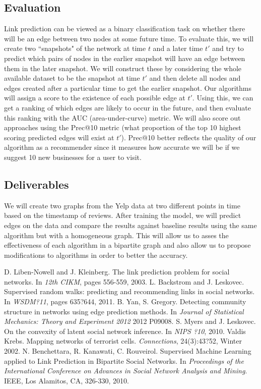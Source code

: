 \documentclass[11pt]{article}
\begin{document}
\subsection{Evaluation}
Link prediction can be viewed as a binary classification task on whether there will be an edge between two nodes at some future time. To evaluate this, we will create two ``snapshots" of the network at time $t$ and a later time $t'$ and try to predict which pairs of nodes in the earlier snapshot will have an edge between them in the later snapshot. We will construct these by considering the whole available dataset to be the snapshot at time $t'$ and then delete all nodes and edges created after a particular time to get the earlier snapshot. Our algorithms will assign a score to the existence of each possible edge at $t'$. Using this, we can get a ranking of which edges are likely to occur in the future, and then evaluate this ranking with the AUC (area-under-curve) metric. We will also score out approaches using the Prec@10 metric (what proportion of the top 10 highest scoring predicted edges will exist at $t'$). Prec@10 better reflects the quality of our algorithm as a recommender since it measures how accurate we will be if we suggest 10 new businesses for a user to visit. 

\subsection{Deliverables}
We will create two graphs from the Yelp data at two different points in time based on the timestamp of reviews.  After training the model, we will predict edges on the data and compare the results against baseline results using the same algorithm but with a homogeneous graph.  This will allow us to asses the effectiveness of each algorithm in a bipartite graph and also allow us to propose modifications to algorithms in order to better the accuracy.

\pagebreak
\begin{thebibliography}{9}
D. Liben-Nowell and J. Kleinberg. The link prediction
problem for social networks. In \emph{12th CIKM}, pages 556-559, 2003.
L. Backstrom and J. Leskovec. Supervised random walks: predicting and recommending links in social networks. In \emph{WSDM?11}, pages 635?644, 2011.
B. Yan, S. Gregory. Detecting community structure in networks using edge prediction methods. In \emph{Journal of Statistical Mechanics: Theory and Experiment 2012} 2012 P09008.
S. Myers and J. Leskovec. On the convexity of latent social network inference. In \emph{NIPS ?10}, 2010.
Valdis Krebs. Mapping networks of terrorist cells. \emph{Connections}, 24(3):43?52, Winter 2002.
N. Benchettara, R. Kanawati, C. Rouveirol. Supervised Machine Learning applied to Link Prediction in Bipartite Social Networks. In \emph{Proceedings of the International Conference on Advances in Social Network Analysis and Mining}. IEEE, Los Alamitos, CA, 326-330, 2010.
\end{thebibliography}
\end{document}
